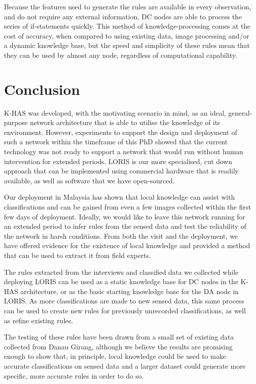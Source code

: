             Because the features used to generate the rules are available in every observation, and do not require any external information, DC nodes are able to process the series of if-statements quickly. This method of knowledge-processing comes at the cost of accuracy, when compared to using existing data, image processing and/or a dynamic knowledge base, but the speed and simplicity of these rules mean that they can be used by almost any node, regardless of computational capability. 

	\section{Conclusion}\label{loris:conc}
	 K-HAS was developed, with the motivating scenario in mind, as an ideal, general-purpose network architecture that is able to utilise the knowledge of its environment. However, experiments to support the design and deployment of such a network within the timeframe of this PhD showed that the current technology was not ready to support a network that would run without human intervention for extended periods. LORIS is our more specialised, cut down approach that can be implemented using commercial hardware that is readily available, as well as software that we have open-sourced. 
	
	Our deployment in Malaysia has shown that local knowledge can assist with classifications and can be gained from even a few images collected within the first few days of deployment. Ideally, we would like to leave this network running for an extended period to infer rules from the sensed data and test the reliability of the network in harsh conditions. From both the visit and the deployment, we have offered evidence for the existence of local knowledge and provided a method that can be used to extract it from field experts. 
    
        The rules extracted from the interviews and classified data we collected while deploying LORIS can be used as a static knowledge base for DC nodes in the K-HAS architecture, or as the basic starting knowledge base for the DA node in LORIS. As more classifications are made to new sensed data, this same process can be used to create new rules for previously unrecorded classifications, as well as refine existing rules. 

    The testing of these rules have been drawn from a small set of existing data collected from Danau Girang, although we believe the results are promising enough to show that, in principle, local knowledge could be used to make accurate classifications on sensed data and a larger dataset could generate more specific, more accurate rules in order to do so.
	
